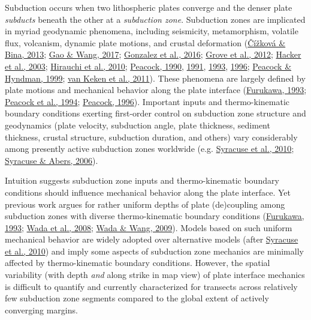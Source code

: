 Subduction occurs when two lithospheric plates converge and the denser plate \emph{subducts} beneath the other at a \emph{subduction zone}. Subduction zones are implicated in myriad geodynamic phenomena, including seismicity, metamorphism, volatile flux, volcanism, dynamic plate motions, and crustal deformation (\protect\hyperlink{ref-cizkova2013}{Čížková \& Bina, 2013}; \protect\hyperlink{ref-gao2017}{Gao \& Wang, 2017}; \protect\hyperlink{ref-gonzalez2016}{Gonzalez et al., 2016}; \protect\hyperlink{ref-grove2012}{Grove et al., 2012}; \protect\hyperlink{ref-hacker2003}{Hacker et al., 2003}; \protect\hyperlink{ref-hirauchi2010}{Hirauchi et al., 2010}; \protect\hyperlink{ref-peacock1990}{Peacock, 1990}, \protect\hyperlink{ref-peacock1991}{1991}, \protect\hyperlink{ref-peacock1993}{1993}, \protect\hyperlink{ref-peacock1996}{1996}; \protect\hyperlink{ref-peacock1999a}{Peacock \& Hyndman, 1999}; \protect\hyperlink{ref-vankeken2011}{van Keken et al., 2011}). These phenomena are largely defined by plate motions and mechanical behavior along the plate interface (\protect\hyperlink{ref-furukawa1993}{Furukawa, 1993}; \protect\hyperlink{ref-peacock1994}{Peacock et al., 1994}; \protect\hyperlink{ref-peacock1996}{Peacock, 1996}). Important inputs and thermo-kinematic boundary conditions exerting first-order control on subduction zone structure and geodynamics (plate velocity, subduction angle, plate thickness, sediment thickness, crustal structure, subduction duration, and others) vary considerably among presently active subduction zones worldwide (e.g. \protect\hyperlink{ref-syracuse2010}{Syracuse et al., 2010}; \protect\hyperlink{ref-syracuse2006}{Syracuse \& Abers, 2006}).

Intuition suggests subduction zone inputs and thermo-kinematic boundary conditions should influence mechanical behavior along the plate interface. Yet previous work argues for rather uniform depths of plate (de)coupling among subduction zones with diverse thermo-kinematic boundary conditions (\protect\hyperlink{ref-furukawa1993}{Furukawa, 1993}; \protect\hyperlink{ref-wada2008}{Wada et al., 2008}; \protect\hyperlink{ref-wada2009}{Wada \& Wang, 2009}). Models based on such uniform mechanical behavior are widely adopted over alternative models (after \protect\hyperlink{ref-syracuse2010}{Syracuse et al., 2010}) and imply some aspects of subduction zone mechanics are minimally affected by thermo-kinematic boundary conditions. However, the spatial variability (with depth \emph{and} along strike in map view) of plate interface mechanics is difficult to quantify and currently characterized for transects across relatively few subduction zone segments compared to the global extent of actively converging margins.

